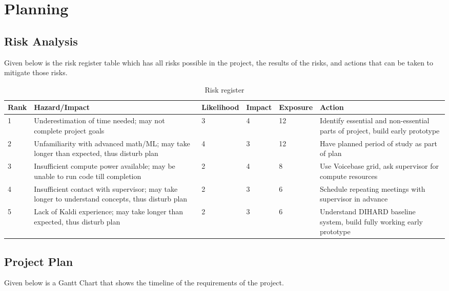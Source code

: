 \chapter{Planning}

\section{Risk Analysis}

Given below is the risk register table which has all risks possible in the project, the results of the risks, and actions that can be taken to mitigate those risks.

\begin{table}[ht]
\center
\begin{tabular}{|p{0.75cm}|p{5cm}|p{1.75cm}|p{1cm}|p{1.75cm}|p{4cm}|}
\hline
Rank & Hazard/Impact & Likelihood & Impact & Exposure & Action\\
\hline
1 & Underestimation of time needed; may not complete project goals & 3 & 4 & 12 & Identify essential and non-essential parts of project, build early prototype \\
\hline
2 & Unfamiliarity with advanced math/ML; may take longer than expected, thus disturb plan & 4 & 3 & 12 & Have planned period of study as part of plan \\
\hline
3 & Insufficient compute power available; may be unable to run code till completion & 2 & 4 & 8 & Use Voicebase grid, ask supervisor for compute resources \\
\hline
4 & Insufficient contact with supervisor; may take longer to understand concepts, thus disturb plan & 2 & 3 & 6 & Schedule repeating meetings with supervisor in advance \\
\hline
5 & Lack of Kaldi experience; may take longer than expected, thus disturb plan & 2 & 3 & 6 & Understand DIHARD baseline system, build fully working early prototype \\
\hline
\end{tabular}
\caption{Risk register}
\label{tab:risks}
\end{table}


\section{Project Plan}

Given below is a Gantt Chart that shows the timeline of the requirements of the project.

